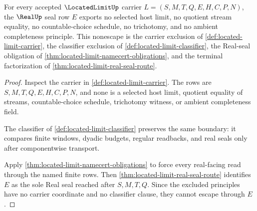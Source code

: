 \begin{theorem}
\label{thm:located-limit-real-seal-nonescape}
For every accepted $\LocatedLimitUp$ carrier $L=(S,M,T,Q,E,H,C,P,N)$, the $\RealUp$ seal row $E$ exports no selected host limit, no quotient stream equality, no countable-choice schedule, no trichotomy, and no ambient completeness principle. This nonescape is the carrier exclusion of \autoref{def:located-limit-carrier}, the classifier exclusion of \autoref{def:located-limit-classifier}, the Real-seal obligation of \autoref{thm:located-limit-namecert-obligations}, and the terminal factorization of \autoref{thm:located-limit-real-seal-route}.
\end{theorem}
\begin{proof}
Inspect the carrier in \autoref{def:located-limit-carrier}. The rows are $S,M,T,Q,E,H,C,P,N$, and none is a selected host limit, quotient equality of streams, countable-choice schedule, trichotomy witness, or ambient completeness field.

The classifier of \autoref{def:located-limit-classifier} preserves the same boundary: it compares finite windows, dyadic budgets, regular readbacks, and real seals only after componentwise transport.

Apply \autoref{thm:located-limit-namecert-obligations} to force every real-facing read through the named finite rows. Then \autoref{thm:located-limit-real-seal-route} identifies $E$ as the sole Real seal reached after $S,M,T,Q$. Since the excluded principles have no carrier coordinate and no classifier clause, they cannot escape through $E$.
\end{proof}



